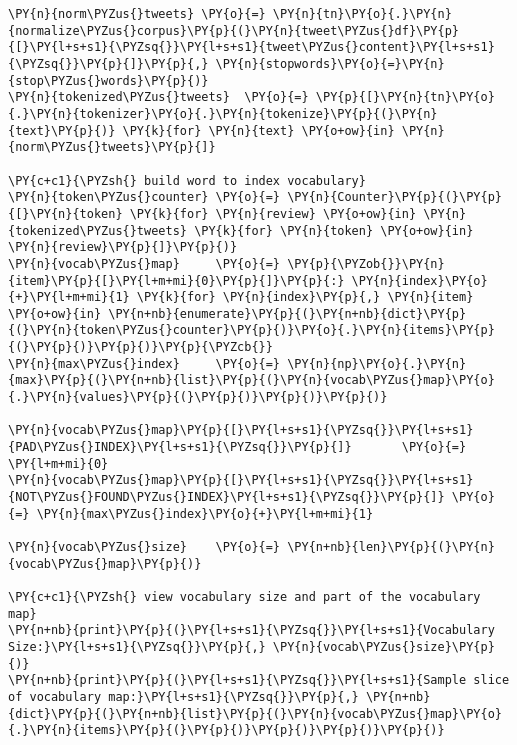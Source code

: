     \begin{tcolorbox}[breakable, size=fbox, boxrule=1pt, pad at break*=1mm,colback=cellbackground, colframe=cellborder]
\begin{Verbatim}[commandchars=\\\{\}]
\PY{n}{norm\PYZus{}tweets} \PY{o}{=} \PY{n}{tn}\PY{o}{.}\PY{n}{normalize\PYZus{}corpus}\PY{p}{(}\PY{n}{tweet\PYZus{}df}\PY{p}{[}\PY{l+s+s1}{\PYZsq{}}\PY{l+s+s1}{tweet\PYZus{}content}\PY{l+s+s1}{\PYZsq{}}\PY{p}{]}\PY{p}{,} \PY{n}{stopwords}\PY{o}{=}\PY{n}{stop\PYZus{}words}\PY{p}{)}
\PY{n}{tokenized\PYZus{}tweets}  \PY{o}{=} \PY{p}{[}\PY{n}{tn}\PY{o}{.}\PY{n}{tokenizer}\PY{o}{.}\PY{n}{tokenize}\PY{p}{(}\PY{n}{text}\PY{p}{)} \PY{k}{for} \PY{n}{text} \PY{o+ow}{in} \PY{n}{norm\PYZus{}tweets}\PY{p}{]}

\PY{c+c1}{\PYZsh{} build word to index vocabulary}
\PY{n}{token\PYZus{}counter} \PY{o}{=} \PY{n}{Counter}\PY{p}{(}\PY{p}{[}\PY{n}{token} \PY{k}{for} \PY{n}{review} \PY{o+ow}{in} \PY{n}{tokenized\PYZus{}tweets} \PY{k}{for} \PY{n}{token} \PY{o+ow}{in} \PY{n}{review}\PY{p}{]}\PY{p}{)}
\PY{n}{vocab\PYZus{}map}     \PY{o}{=} \PY{p}{\PYZob{}}\PY{n}{item}\PY{p}{[}\PY{l+m+mi}{0}\PY{p}{]}\PY{p}{:} \PY{n}{index}\PY{o}{+}\PY{l+m+mi}{1} \PY{k}{for} \PY{n}{index}\PY{p}{,} \PY{n}{item} \PY{o+ow}{in} \PY{n+nb}{enumerate}\PY{p}{(}\PY{n+nb}{dict}\PY{p}{(}\PY{n}{token\PYZus{}counter}\PY{p}{)}\PY{o}{.}\PY{n}{items}\PY{p}{(}\PY{p}{)}\PY{p}{)}\PY{p}{\PYZcb{}}
\PY{n}{max\PYZus{}index}     \PY{o}{=} \PY{n}{np}\PY{o}{.}\PY{n}{max}\PY{p}{(}\PY{n+nb}{list}\PY{p}{(}\PY{n}{vocab\PYZus{}map}\PY{o}{.}\PY{n}{values}\PY{p}{(}\PY{p}{)}\PY{p}{)}\PY{p}{)}

\PY{n}{vocab\PYZus{}map}\PY{p}{[}\PY{l+s+s1}{\PYZsq{}}\PY{l+s+s1}{PAD\PYZus{}INDEX}\PY{l+s+s1}{\PYZsq{}}\PY{p}{]}       \PY{o}{=} \PY{l+m+mi}{0}
\PY{n}{vocab\PYZus{}map}\PY{p}{[}\PY{l+s+s1}{\PYZsq{}}\PY{l+s+s1}{NOT\PYZus{}FOUND\PYZus{}INDEX}\PY{l+s+s1}{\PYZsq{}}\PY{p}{]} \PY{o}{=} \PY{n}{max\PYZus{}index}\PY{o}{+}\PY{l+m+mi}{1}

\PY{n}{vocab\PYZus{}size}    \PY{o}{=} \PY{n+nb}{len}\PY{p}{(}\PY{n}{vocab\PYZus{}map}\PY{p}{)}

\PY{c+c1}{\PYZsh{} view vocabulary size and part of the vocabulary map}
\PY{n+nb}{print}\PY{p}{(}\PY{l+s+s1}{\PYZsq{}}\PY{l+s+s1}{Vocabulary Size:}\PY{l+s+s1}{\PYZsq{}}\PY{p}{,} \PY{n}{vocab\PYZus{}size}\PY{p}{)}
\PY{n+nb}{print}\PY{p}{(}\PY{l+s+s1}{\PYZsq{}}\PY{l+s+s1}{Sample slice of vocabulary map:}\PY{l+s+s1}{\PYZsq{}}\PY{p}{,} \PY{n+nb}{dict}\PY{p}{(}\PY{n+nb}{list}\PY{p}{(}\PY{n}{vocab\PYZus{}map}\PY{o}{.}\PY{n}{items}\PY{p}{(}\PY{p}{)}\PY{p}{)}\PY{p}{)}\PY{p}{)}


\end{Verbatim}
\end{tcolorbox}
